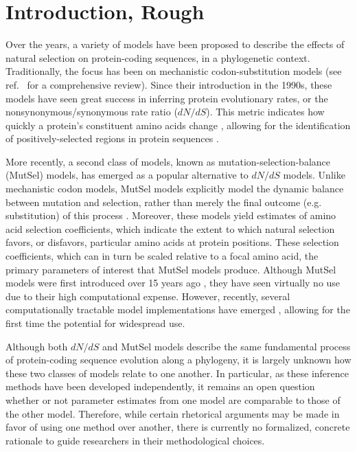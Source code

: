 \documentclass[11pt]{article}
\begin{document}
\section*{Introduction, Rough}

Over the years, a variety of models have been proposed to describe the effects of natural selection on protein-coding sequences, in a phylogenetic context. Traditionally, the focus has been on mechanistic codon-substitution models (see ref.~\cite{Anisimova2009} for a comprehensive review). Since their introduction in the 1990s, these models have seen great success in inferring protein evolutionary rates, or the nonsynonymous/synonymous rate ratio ($dN/dS$). This metric indicates how quickly a protein's constituent amino acids change \cite{GoldmanYang1994, MuseGaut1994, NielsenYang1998}, allowing for the identification of positively-selected regions in protein sequences \cite{ NielsenYang1998,Yangetal2000}. 

More recently, a second class of models, known as mutation-selection-balance (MutSel) models, has emerged as a popular alternative to $dN/dS$ models. Unlike mechanistic codon models, MutSel models explicitly model the dynamic balance between mutation and selection, rather than merely the final outcome (e.g. substitution) of this process \cite{HalpernBruno1998, YangNielsen2008, Rodrigueetal2010, Tamurietal2012}. Moreover, these models yield estimates of amino acid selection coefficients, which indicate the extent to which natural selection favors, or disfavors, particular amino acids at protein positions. These selection coefficients, which can in turn be scaled relative to a focal amino acid, the primary parameters of interest that MutSel models produce. Although MutSel models were first introduced over 15 years ago \cite{HalpernBruno1998}, they have seen virtually no use due to their high computational expense. However, recently, several computationally tractable model implementations have emerged \cite{RodrigueLartillot2014,Tamurietal2014}, allowing for the first time the potential for widespread use. 

Although both $dN/dS$ and MutSel models describe the same fundamental process of protein-coding sequence evolution along a phylogeny, it is largely unknown how these two classes of models relate to one another. In particular, as these inference methods have been developed independently, it remains an open question whether or not parameter estimates from one model are comparable to those of the other model. Therefore, while certain rhetorical arguments may be made in favor of using one method over another, there is currently no formalized, concrete rationale to guide researchers in their methodological choices. 
\end{document}
